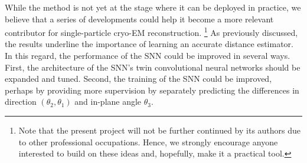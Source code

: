 While the method is not yet at the stage where it can be deployed in practice, we believe that a series of developments could help it become a more relevant contributor for single-particle cryo-EM reconstruction.%
\footnote{Note that the present project will not be further continued by its authors due to other professional occupations. Hence, we strongly encourage anyone interested to build on these ideas and, hopefully, make it a practical tool.}
As previously discussed, the results underline the importance of learning an accurate distance estimator. %
In this regard, the performance of the SNN could be improved in several ways.
First, the architecture of the SNN's twin convolutional neural networks should be expanded and tuned.
Second, the training of the SNN could be improved, perhaps by providing more supervision by separately predicting the differences in direction $(\theta_2,\theta_1)$ and in-plane angle $\theta_3$.



